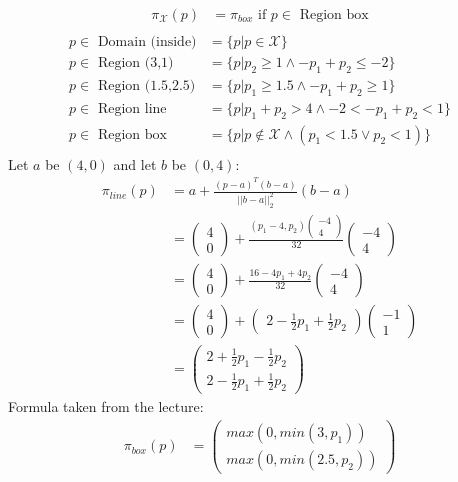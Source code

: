 \begin{flushleft}
\begin{align*}
\pi_\mathcal{X}(p) &= \pi_{box} \text{ if } p \in \text{ Region box}\\
\end{align*}
\begin{align*}
p \in \text{ Domain (inside)} &= \{p | p \in \mathcal{X}\}\\
p \in \text{ Region (3,1) } &= \{p | p_2 \geq 1 \land -p_1 + p_2 \leq -2\}\\
p \in \text{ Region (1.5,2.5)} &= \{p | p_1  \geq 1.5 \land -p_1+p_2 \geq 1\}\\
p \in \text{ Region line} &= \{p | p_1 +p_2 > 4 \land -2 < -p_1+p_2 < 1\}\\
p \in \text{ Region box} &= \{p | p \notin \mathcal{X} \land (p_1 < 1.5 \lor p_2 < 1)\}\\
\end{align*}
Let $a$ be $(4,0)$ and let $b$ be $(0,4)$:\\ 
\begin{align*}
\pi_{line}(p) &= a + \frac{(p-a)^{T}(b-a)}{||b-a||^{2}_{2}}(b-a)\\
&= \begin{pmatrix}4\\0\end{pmatrix} + \frac{(p_1-4, p_2)\begin{pmatrix}-4\\4\end{pmatrix}}{32} \begin{pmatrix}-4\\4\end{pmatrix}\\
&= \begin{pmatrix}4\\0\end{pmatrix} + \frac{16-4p_1+4p_2}{32} \begin{pmatrix}-4\\4\end{pmatrix}\\
&= \begin{pmatrix}4\\0\end{pmatrix} + \begin{pmatrix}2-\frac{1}{2}p_1+\frac{1}{2}p_2\end{pmatrix} \begin{pmatrix}-1\\1\end{pmatrix}\\
&=\begin{pmatrix}2+\frac{1}{2}p_1-\frac{1}{2}p_2\\2-\frac{1}{2}p_1+\frac{1}{2}p_2\end{pmatrix}
\end{align*}
Formula taken from the lecture:
\begin{align*}
\pi_{box}(p) &= \begin{pmatrix}max(0, min(3, p_1))\\max(0, min(2.5, p_2))\end{pmatrix}
\end{align*}
\end{flushleft}
%
%
%

